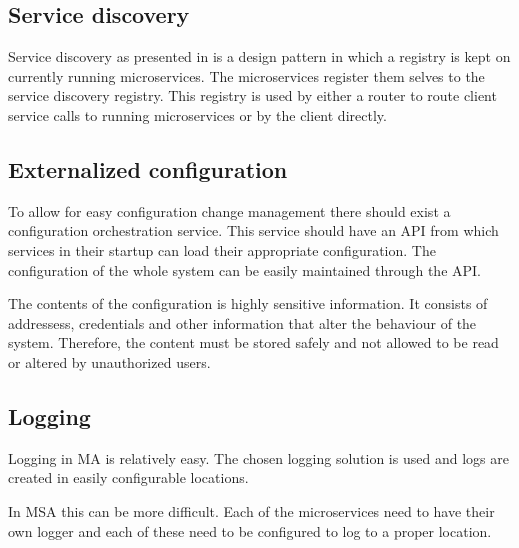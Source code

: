 \subsection{Service discovery}
\begin{sloppypar}
    Service discovery as presented in \citet{DBLP:journals/corr/MontesiW16} is a
    design pattern in which a registry is kept on currently running
    microservices. The microservices register them selves to the service
    discovery registry. This registry is used by either a router to route client
    service calls to running microservices or by the client directly.
\end{sloppypar}


\subsection{Externalized configuration}
\begin{sloppypar}
    To allow for easy configuration change management there should exist a
    configuration orchestration service. This service should have an API from
    which services in their startup can load their appropriate configuration.
    The configuration of the whole system can be easily maintained through the
    API.
\end{sloppypar}
\begin{sloppypar}
    The contents of the configuration is highly sensitive information. It
    consists of addressess, credentials and other information that alter the
    behaviour of the system. Therefore, the content must be stored safely and
    not allowed to be read or altered by unauthorized users.
\end{sloppypar}

\subsection{Logging}
\begin{sloppypar}
    Logging in MA is relatively easy. The chosen logging solution is used and
    logs are created in easily configurable locations.
\end{sloppypar}
\begin{sloppypar}
    In MSA this can be more difficult. Each of the microservices need to have
    their own logger and each of these need to be configured to log to a proper
    location.
\end{sloppypar}


